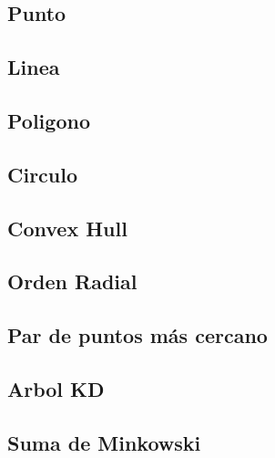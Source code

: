 \documentclass[a4paper,11pt,landscape,twocolumn]{article}
\begin{document}
\subsection{Punto}



\subsection{Linea}



\subsection{Poligono}



\subsection{Circulo}



\subsection{Convex Hull}



\subsection{Orden Radial}



\subsection{Par de puntos más cercano}



\subsection{Arbol KD}



\subsection{Suma de Minkowski}
\end{document}
